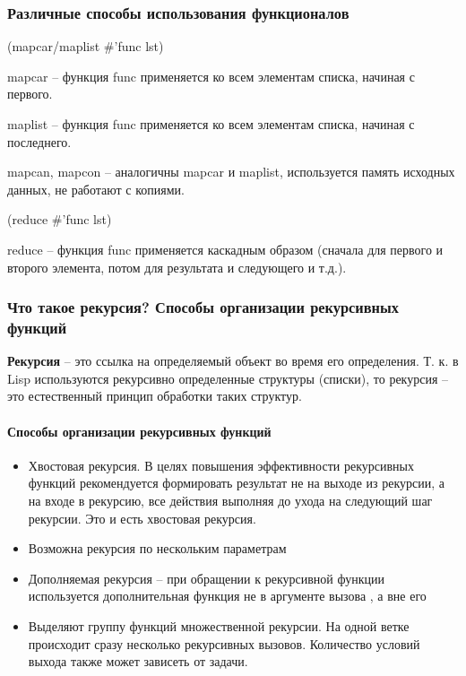 \subsubsection{Различные способы использования функционалов}

{\ttfamily (mapcar/maplist $\#$'func lst)}

{\ttfamily mapcar} -- функция func применяется ко всем элементам списка, начиная
с первого.

{\ttfamily maplist} -- функция func применяется ко всем элементам списка, начиная
с последнего.

{\ttfamily mapcan, mapcon} -- аналогичны mapcar и maplist, используется память
исходных данных, не работают с копиями.

{\ttfamily (reduce $\#$’func lst)}

{\ttfamily reduce} -- функция func применяется каскадным образом
(сначала для первого и второго элемента, потом для результата и следующего и т.д.).

\subsubsection{Что такое рекурсия?
Способы организации рекурсивных функций}

\textbf{Рекурсия} -- это ссылка на определяемый объект во
время его определения.
Т. к. в Lisp используются рекурсивно определенные структуры (списки),
то рекурсия -- это естественный принцип обработки таких структур.

\paragraph{Способы организации рекурсивных функций}

\begin{itemize}
    \item Хвостовая рекурсия. В целях повышения эффективности рекурсивных
        функций рекомендуется формировать результат не на выходе из рекурсии,
        а на входе в рекурсию, все действия выполняя до ухода на следующий шаг
        рекурсии. Это и есть хвостовая рекурсия.
    \item Возможна рекурсия по нескольким параметрам
    \item Дополняемая рекурсия -- при обращении к рекурсивной функции
        используется дополнительная функция не в аргументе вызова , а вне его
    \item Выделяют группу функций множественной рекурсии. На одной
        ветке происходит сразу несколько рекурсивных вызовов. Количество
        условий выхода также может зависеть от задачи.
\end{itemize}

